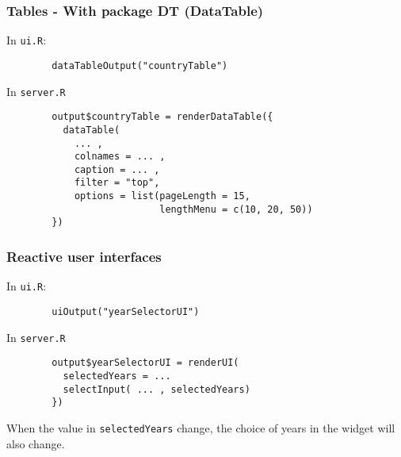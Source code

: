 \documentclass{beamer}
\begin{document}
	\begin{frame}[fragile]
		\frametitle{Tables - With package DT (DataTable)}
		
		In \verb|ui.R|:
		\begin{exampleblock}{}
		\begin{BVerbatim}
		dataTableOutput("countryTable")
		\end{BVerbatim}
		\end{exampleblock}{}

		\vspace{1em}

		In \verb|server.R|
		\begin{exampleblock}{}
		\begin{BVerbatim}
		output$countryTable = renderDataTable({
		  dataTable(
		    ... ,
		    colnames = ... ,
		    caption = ... ,
		    filter = "top",
		    options = list(pageLength = 15,
		                   lengthMenu = c(10, 20, 50))
		})
		\end{BVerbatim}
		\end{exampleblock}{}

	\end{frame}

	\begin{frame}[fragile]
		\frametitle{Reactive user interfaces}
		
		In \verb|ui.R|:
		\begin{exampleblock}{}
		\begin{BVerbatim}
		uiOutput("yearSelectorUI")
		\end{BVerbatim}
		\end{exampleblock}{}

		\vspace{1em}

		In \verb|server.R|
		\begin{exampleblock}{}
		\begin{BVerbatim}
		output$yearSelectorUI = renderUI(
		  selectedYears = ...
		  selectInput( ... , selectedYears)
		})
		\end{BVerbatim}
		\end{exampleblock}{}

		\vspace{1em}

		When the value in \verb|selectedYears| change, the choice of years in the widget will also change.

	\end{frame}
\end{document}
